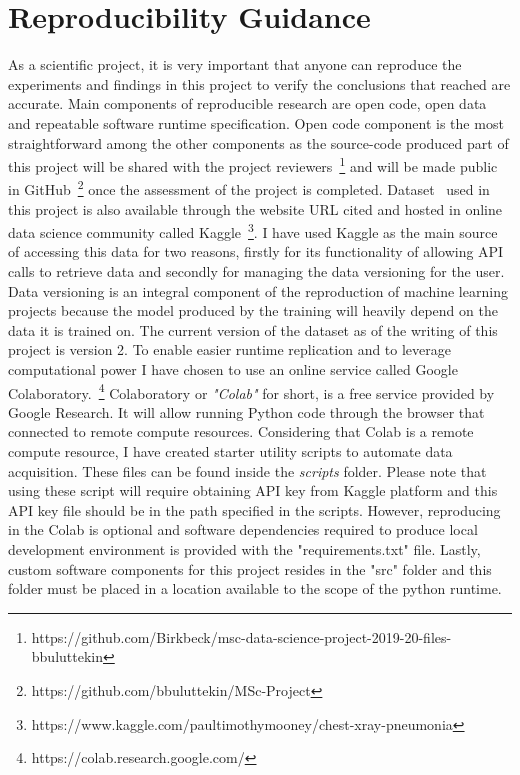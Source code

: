 \section{Reproducibility Guidance} \label{sec:reproducibility}
As a scientific project, it is very important that anyone can reproduce the experiments and findings in this project to verify the conclusions that reached are accurate. Main components of reproducible research are open code, open data and repeatable software runtime specification. Open code component is the most straightforward among the other components as the source-code produced part of this project will be shared with the project reviewers~\footnote{https://github.com/Birkbeck/msc-data-science-project-2019-20-files-bbuluttekin} and will be made public in GitHub~\footnote{https://github.com/bbuluttekin/MSc-Project} once the assessment of the project is completed. Dataset~\cite{dataset} used in this project is also available through the website URL cited and hosted in online data science community called Kaggle~\footnote{https://www.kaggle.com/paultimothymooney/chest-xray-pneumonia}. I have used Kaggle as the main source of accessing this data for two reasons, firstly for its functionality of allowing API calls to retrieve data and secondly for managing the data versioning for the user. Data versioning is an integral component of the reproduction of machine learning projects because the model produced by the training will heavily depend on the data it is trained on. 
The current version of the dataset as of the writing of this project is version 2. 
To enable easier runtime replication and to leverage computational power I have chosen to use an online service called Google Colaboratory.~\footnote{https://colab.research.google.com/} Colaboratory or \emph{"Colab"} for short, is a free service provided by Google Research. It will allow running Python code through the browser that connected to remote compute resources. Considering that Colab is a remote compute resource, I have created starter utility scripts to automate data acquisition. These files can be found inside the \emph{scripts} folder. Please note that using these script will require obtaining API key from Kaggle platform and this API key file should be in the path specified in the scripts. However, reproducing in the Colab is optional and software dependencies required to produce local development environment is provided with the "requirements.txt" file. Lastly, custom software components for this project resides in the "src" folder and this folder must be placed in a location available to the scope of the python runtime.


\clearpage